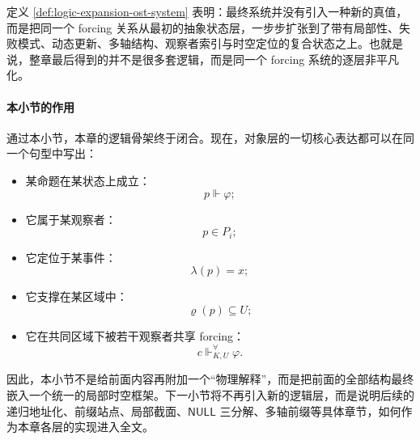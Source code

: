 定义 \ref{def:logic-expansion-ost-system} 表明：最终系统并没有引入一种新的真值，而是把同一个 forcing 关系从最初的抽象状态层，一步步扩张到了带有局部性、失败模式、动态更新、多轴结构、观察者索引与时空定位的复合状态之上。也就是说，整章最后得到的并不是很多套逻辑，而是同一个 forcing 系统的逐层非平凡化。

\paragraph{本小节的作用}
通过本小节，本章的逻辑骨架终于闭合。现在，对象层的一切核心表达都可以在同一个句型中写出：
\begin{itemize}
  \item 某命题在某状态上成立：
  \[
  p\Vdash \varphi;
  \]
  \item 它属于某观察者：
  \[
  p\in P_i;
  \]
  \item 它定位于某事件：
  \[
  \lambda(p)=x;
  \]
  \item 它支撑在某区域中：
  \[
  \varrho(p)\subseteq U;
  \]
  \item 它在共同区域下被若干观察者共享 forcing：
  \[
  c\Vdash^{\forall}_{K,U}\varphi.
  \]
\end{itemize}

因此，本小节不是给前面内容再附加一个“物理解释”，而是把前面的全部结构最终嵌入一个统一的局部时空框架。下一小节将不再引入新的逻辑层，而是说明后续的递归地址化、前缀站点、局部截面、\(\mathsf{NULL}\) 三分解、多轴前缀等具体章节，如何作为本章各层的实现进入全文。
